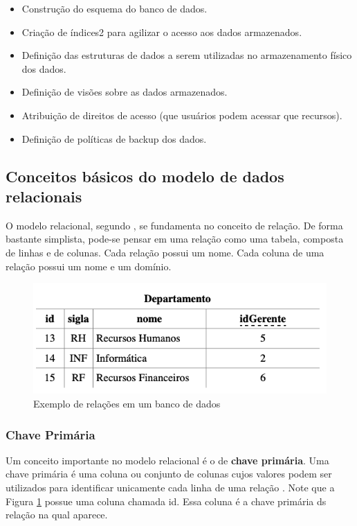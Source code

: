 \begin{itemize}
	\item Construção do esquema do banco de dados.
	\item Criação de índices2 para agilizar o acesso aos dados armazenados.
	\item Definição das estruturas de dados a serem utilizadas no armazenamento físico dos dados.
	\item Definição de visões sobre as dados armazenados.
	\item Atribuição de direitos de acesso (que usuários podem acessar que recursos).
	\item Definição de políticas de backup dos dados.
\end{itemize}

\subsection{Conceitos básicos do modelo de dados relacionais}

O modelo relacional, segundo , se fundamenta no conceito de relação. De forma bastante simplista, pode-se pensar em uma relação como uma tabela, composta de linhas e de colunas. Cada relação possui um nome. Cada coluna de uma relação possui um nome e um domínio.

\begin{figure}[H]
	\centering
	\includegraphics[scale=0.6]{imagens/banco1.png}
	\caption{Exemplo de relações em um banco de dados}
	\label{fig:figura-01-banco-01}
\end{figure}

\subsubsection{Chave Primária}
Um conceito importante no modelo relacional é o de \textbf{chave primária}. Uma chave primária é uma coluna ou conjunto de colunas cujos valores podem ser utilizados para identificar unicamente cada linha de uma relação \cite{bezerra2016principios}. Note que a Figura \ref{fig:figura-01-banco-01} possue uma coluna chamada id. Essa coluna é a chave primária ds relação na qual aparece.

